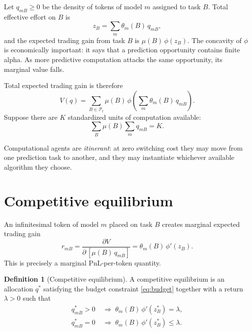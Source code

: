 \documentclass[11pt]{article}
\theoremstyle{definition}
\newtheorem{definition}{Definition}
\theoremstyle{remark}
\begin{document}
Let $q_{mB} \ge 0$ be the density of tokens of model $m$ assigned to task $B$. Total effective effort on $B$ is
\begin{equation}
z_B = \sum_{m} \theta_m(B)\, q_{mB},
\end{equation}
and the expected trading gain from task $B$ is $\mu(B)\,\phi(z_B)$. The concavity of $\phi$ is economically important: it says that a prediction opportunity contains finite alpha. As more predictive computation attacks the same opportunity, its marginal value falls.

Total expected trading gain is therefore
\begin{equation}
\label{eq:V}
V(q) = \sum_{B \in \mathcal{P}_t} \mu(B)\, \phi\!\left( \sum_m \theta_m(B)\, q_{mB} \right).
\end{equation}
Suppose there are $K$ standardized units of computation available:
\begin{equation}
\label{eq:budget}
\sum_B \mu(B) \sum_m q_{mB} = K.
\end{equation}

Computational agents are \emph{itinerant}: at zero switching cost they may move from one prediction task to another, and they may instantiate whichever available algorithm they choose.

\section{Competitive equilibrium}
\label{sec:equilibrium}

An infinitesimal token of model $m$ placed on task $B$ creates marginal expected trading gain
\begin{equation}
\label{eq:return}
r_{mB} = \frac{\partial V}{\partial\, [\mu(B)\, q_{mB}]} = \theta_m(B)\, \phi'(z_B).
\end{equation}
This is precisely a marginal PnL-per-token quantity.

\begin{definition}[Competitive equilibrium]
A competitive equilibrium is an allocation $q^*$ satisfying the budget constraint \eqref{eq:budget} together with a return $\lambda > 0$ such that
\begin{align}
q^*_{mB} > 0 &\;\Longrightarrow\; \theta_m(B)\, \phi'(z^*_B) = \lambda, \label{eq:eq1}\\
q^*_{mB} = 0 &\;\Longrightarrow\; \theta_m(B)\, \phi'(z^*_B) \le \lambda. \label{eq:eq2}
\end{align}
\end{definition}
\end{document}
